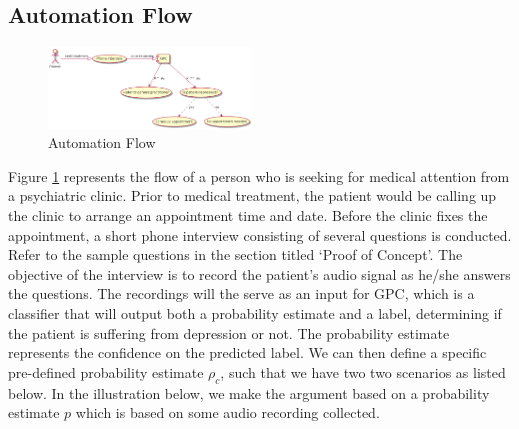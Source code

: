 \documentclass{article}
\begin{document}
	\subsection{Automation Flow} \label{af}
	\begin{figure}[h]
 		\begin{center}
		\includegraphics[width=0.48\textwidth]{automation} 
  		\end{center}
  		\caption{Automation Flow}
  		\label{auto_flow} 
 	\end{figure}

	Figure \ref{auto_flow} represents the flow of a person who is seeking for medical attention from a psychiatric clinic.
	Prior to medical treatment, the patient would be calling up the clinic to arrange an appointment time and date. 
	Before the clinic fixes the appointment, a short phone interview consisting of several questions is conducted.
	Refer to the sample questions in the section titled `Proof of Concept'.
	The objective of the interview is to record the patient's audio signal as he/she answers the questions.
	The recordings will the serve as an input for GPC, which is a classifier that will output both a probability estimate and a label, determining if the patient is suffering from depression or not.
	The probability estimate represents the confidence on the predicted label. 
	We can then define a specific pre-defined probability estimate $\rho_c$, such that we have two two scenarios as listed below. 
	In the illustration below, we make the argument based on a probability estimate $p$ which is based on some audio recording collected.
	
\end{document}

